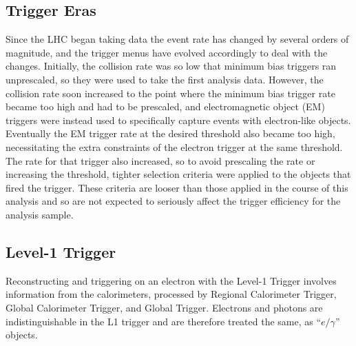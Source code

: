 \subsection{Trigger Eras}
\label{evSel:triggerEras}
Since the LHC began taking data the event rate has changed by several orders of magnitude,  
and the trigger menus have evolved accordingly to deal with the changes.  
Initially, the collision rate was so low that minimum bias triggers ran unprescaled, 
so they were used to take the first analysis data.  
However, the collision rate soon increased to the point where the minimum bias trigger rate became too high
and had to be prescaled, 
and 
electromagnetic object (EM) %
triggers were instead used %
to specifically capture events with electron-like objects.  %
Eventually the 
EM %
trigger rate at the desired threshold also became too high,
necessitating the extra constraints of the electron trigger at the same threshold.  
The rate for that trigger also increased, so to avoid prescaling the rate or increasing the threshold,
tighter selection criteria were applied to the objects that fired the trigger.  
These criteria are looser than those applied in the course of this analysis and so are not expected
to seriously affect the trigger efficiency for the analysis sample.  



\subsection{Level-1 Trigger}
\label{evSel:L1}
Reconstructing and triggering on an electron with the Level-1 Trigger 
involves information from the calorimeters, processed by 
Regional Calorimeter Trigger, Global Calorimeter Trigger, and 
Global Trigger.  
Electrons and photons are indistinguishable in the L1 trigger and are therefore 
treated the same, as ``$e/\gamma$'' objects.  

